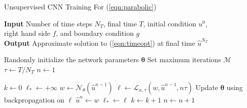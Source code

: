 \documentclass[preprint,12pt]{elsarticle}
\newcommand{\Bk}{\color{black}}
\newcommand{\bftheta}{\boldsymbol{\theta}}
\begin{document}
\begin{algorithm}[ht!]
\caption{Unsupervised CNN Training For (\ref{eqn:parabolic}) \label{alg:alg-parabolic}}
 \hspace*{\algorithmicindent} \textbf{Input} Number of time steps $N_T$, final time $T$, initial condition $u^0$, \\
  \hspace*{\algorithmicindent} right hand side $f$, and boundary condition $g$ \\
 \hspace*{\algorithmicindent} \textbf{Output} Approximate solution to (\ref{eqn:timeopt}) at final time $\hat{u}^{N_T}$
\begin{algorithmic}[1]

\State Randomly initialize the network parameters $\bftheta$
\State Set maximum iterations $\mathcal{M}$
\State $\tau \gets T/N_T$ 
\State $n \gets 1$ 

\State $k \gets 0$ 
\State $\ell_* \gets +\infty$ 
\State $w \gets \mathcal{N}_{\theta}(\hat{u}^{n-1})$ 
\State $\ell \gets \mathcal{L}_{\alpha, \tau}(w, \hat{u}^{n-1}, n \tau)$ 
\State Update $\bftheta$ using backpropagation on $\ell$
\If{$\ell < \ell_*$}
\State $\hat{u}^n \gets w$ 
\State $\ell_* \gets \ell$ 
\EndIf
\State $k \gets k+1$
\EndWhile
\State $n \gets n + 1$
\EndWhile
\end{algorithmic}
\end{algorithm}
\Bk
\end{document}
